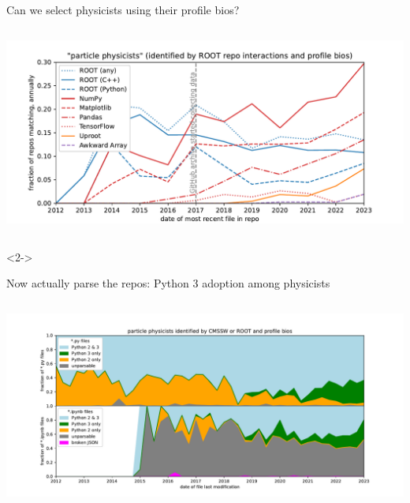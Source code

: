 \documentclass[aspectratio=169]{beamer}
\begin{document}
\begin{frame}{Can we select physicists using their profile bios?}
\begin{columns}
\hspace{-0.25 cm}\includegraphics[width=\linewidth]{analysis/github-package-rootseed-tight-fraction.pdf}
\end{columns}

\begin{uncoverenv}<2->
\vspace{-4.3 cm}
\mbox{ } \hfill {} \hfill \mbox{ }
\vspace{4.3 cm}
\end{uncoverenv}
\end{frame}

\begin{frame}{Now actually parse the repos: Python 3 adoption among physicists}
\begin{columns}
\includegraphics[width=\linewidth]{analysis/github-python-2-3-fraction.pdf}
\end{columns}
\end{frame}
\end{document}
